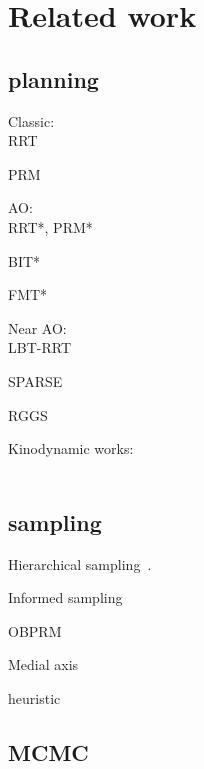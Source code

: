 \documentclass[letterpaper, 10 pt, conference]{ieeeconf}  %
\begin{document}
\section{Related work}
\subsection{planning}
Classic:\\
RRT~\cite{LK01}

PRM~\cite{KSLO96}

AO:\\
RRT*, PRM*~\cite{KF11}

BIT*~\cite{GSB15}

FMT*~\cite{JSCP15}

Near AO:\\
LBT-RRT~\cite{SH16}

SPARSE~\cite{DB14}


RGGS~\cite{SSH16}


Kinodynamic works:\\~\cite{SL14, XBPA15, WB13, KF10}

\subsection{sampling}
Hierarchical sampling~\cite{KTC16}.

Informed sampling~\cite{GSB14}

OBPRM~\cite{ABDJV98, YTEA12}

Medial axis~\cite{LTA03, YDLTA14}

heuristic~\cite{US03, SWT09}

\subsection{MCMC}




%
%
\end{document}

